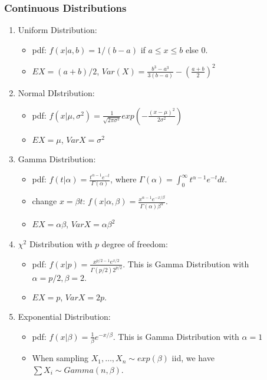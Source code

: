 \documentclass[12pt]{amsart}
\numberwithin{equation}{section}
\theoremstyle{plain}
\theoremstyle{definition}
\begin{document}
\subsubsection{Continuous Distributions}
\begin{enumerate}

\item Uniform Distribution:
\begin{itemize}
\item pdf: $f(x|a,b)=1/(b-a)$ if $a\leq x\leq b$ else 0.
\item $EX = (a+b)/2$, $Var(X) = \frac{b^3-a^3}{3(b-a)}-(\frac{a+b}{2})^2$
\end{itemize}

\item Normal DIstribution:
\begin{itemize}
\item pdf: $f(x|\mu,\sigma^2) = \frac{1}{\sqrt{2\pi\sigma^2}}exp(-\frac{(x-\mu)^2}{2\sigma^2})$
\item $EX = \mu$, $VarX = \sigma^2$
\end{itemize}

\item Gamma Distribution:
\begin{itemize}
\item pdf: $f(t|\alpha) = \frac{t^{\alpha-1}e^{-t}}{\Gamma(\alpha)}$, where $\Gamma(\alpha) = \int_0^\infty t^{\alpha-1}e^{-t}dt$.
\item change $x=\beta t$: $f(x|\alpha, \beta)=\frac{x^{\alpha-1}e^{-x/\beta}}{\Gamma(\alpha)\beta^\alpha}$.
\item $EX=\alpha\beta$, $VarX=\alpha\beta^2$
\end{itemize}

\item $\chi^2$ Distribution with $p$ degree of freedom:
\begin{itemize}
\item pdf: $f(x|p)=\frac{x^{p/2-1}e^{x/2}}{\Gamma(p/2)2^{p/2}}$. This is Gamma Distribution with $\alpha = p/2, \beta = 2.$
\item $EX = p$, $VarX = 2p$.
\end{itemize}

\item Exponential Distribution:
\begin{itemize}
\item pdf: $f(x|\beta)=\frac{1}{\beta}e^{-x/\beta}$. This is Gamma Distribution with $\alpha = 1$
\item When sampling $X_1,\ldots, X_n\sim exp(\beta)$ iid, we have $\sum X_i \sim Gamma(n,\beta)$.
\end{itemize}
\end{enumerate}
\end{document}
